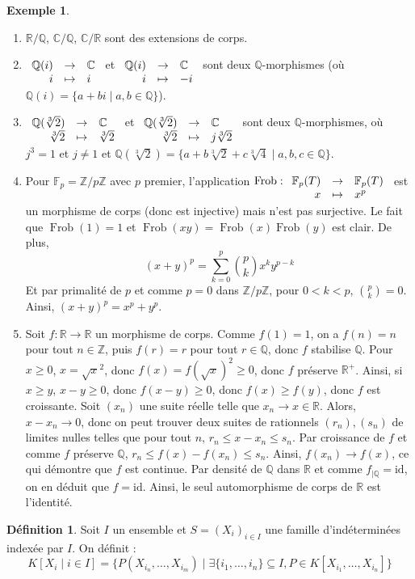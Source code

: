 \documentclass{article}
\newcommand{\id}{\mathrm{id}}
\newcommand{\Z}{\mathbb{Z}}
\newcommand{\Q}{\mathbb{Q}}
\newcommand{\R}{\mathbb{R}}
\newcommand{\C}{\mathbb{C}}
\newcommand{\F}{\mathbb{F}}
\DeclareMathOperator{\Frob}{Frob}
\newcommand{\applic}[4]{\begin{array}[t]{rcl}
#1 & \to & #2 \\
#3 & \mapsto & #4
\end{array}}
\theoremstyle{plain}
\theoremstyle{definition}
\newtheorem{definition}[theorem]{Définition}
\newtheorem{example}[theorem]{Exemple}
\theoremstyle{remark}
\begin{document}
\begin{example} \leavevmode
    \begin{enumerate}
        \item $\R/\Q$, $\C/\Q$, $\C/\R$ sont des extensions de corps.
        \item $\applic{\Q(i)}{\C}{i}{i}$ et $\applic{\Q(i)}{\C}{i}{-i}$ sont deux $\Q$-morphismes (où $\Q(i) = \{a+bi \mid a,b \in \Q\}$).
        \item $\applic{\Q(\sqrt[3]{2})}{\C}{\sqrt[3]{2}}{\sqrt[3]{2}}$ et $\applic{\Q(\sqrt[3]{2})}{\C}{\sqrt[3]{2}}{j\sqrt[3]{2}}$  sont deux $\Q$-morphismes, où $j^3 = 1$ et $j \ne 1$ et $\Q(\sqrt[3]{2}) = \{a + b \sqrt[3]{2} + c \sqrt[3]{4} \mid a,b,c \in \Q\}$.
        \item Pour $\F_p = \Z/p\Z$ avec $p$ premier, l'application $\Frob : \applic{\F_p(T)}{\F_p(T)}{x}{x^p}$ est un morphisme de corps (donc est injective) mais n'est pas surjective. Le fait que $\Frob(1) = 1$ et $\Frob(xy) = \Frob(x)\Frob(y)$ est clair. De plus,
        \[(x+y)^p = \sum_{k=0}^p \binom{p}{k} x^k y^{p-k}\]
        Et par primalité de $p$ et comme $p = 0$ dans $\Z/p\Z$, pour $0 < k < p$, $\binom{p}{k} = 0$. Ainsi, $(x+y)^p = x^p + y^p$.
        \item Soit $f : \R \to \R$ un morphisme de corps. Comme $f(1) = 1$, on a $f(n) = n$ pour tout $n \in \Z$, puis $f(r) = r$ pour tout $r \in \Q$, donc $f$ stabilise $\Q$. Pour $x \ge 0$, $x = \sqrt{x}^2$, donc $f(x) = f(\sqrt{x})^2 \ge 0$, donc $f$ préserve $\R^+$. Ainsi, si $x \ge y$, $x-y \ge 0$, donc $f(x - y) \ge 0$, donc $f(x) \ge f(y)$, donc $f$ est croissante. Soit $(x_n)$ une suite réelle telle que $x_n \to x \in \R$. Alors, $x-x_n \to 0$, donc on peut trouver deux suites de rationnels $(r_n), (s_n)$ de limites nulles telles que pour tout $n$, $r_n \le x-x_n \le s_n$. Par croissance de $f$ et comme $f$ préserve $\Q$, $r_n \le f(x) - f(x_n) \le s_n$. Ainsi, $f(x_n) \to f(x)$, ce qui démontre que $f$ est continue. Par densité de $\Q$ dans $\R$ et comme $f_{\mid \Q} = \id$, on en déduit que $f = \id$. Ainsi, le seul automorphisme de corps de $\R$ est l'identité.
    \end{enumerate}
\end{example}

\begin{definition}
    Soit $I$ un ensemble et $S = (X_i)_{i\in I}$ une famille d'indéterminées indexée par $I$. On définit :
    \[K[X_i \mid i \in I] = \{P(X_{i_n}, \dots,X_{i_m}) \mid \exists \{i_1,\dots,i_n\} \subseteq I, P \in K[X_{i_1},\dots,X_{i_n}]\}\]
\end{definition}
\end{document}
